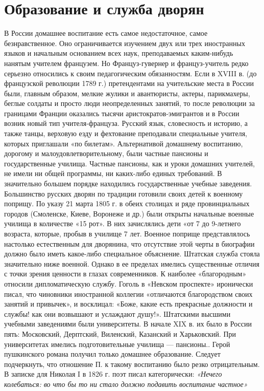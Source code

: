  \section{Образование и служба дворян}
 В России домашнее воспитание есть самое недостаточное, самое безнравственное. Оно ограничивается изучением двух или трех иностранных языков и начальным основанием всех наук, преподаваемых каким-нибудь нанятым учителем французем. Но Француз-гувернер и француз-учитель редко серьезно относились к своим педагогическим обязанностям. Если в XVIII в. (до французской революции 1789 г.) претендентами на учительские места в России были, главным образом, мелкие жулики и авантюристы, актеры, парикмахеры, беглые солдаты и просто люди неопределенных занятий, то после революции за границами Франции оказались тысячи аристократов-эмигрантов и в России возник новый тип учителя-француза. 
 Русский язык, словесность и историю, а также танцы, верховую езду и фехтование преподавали специальные учителя, которых приглашали «по билетам».
Альтернативой домашнему воспитанию, дорогому и малоудовлетворительному, были частные пансионы и государственные училища. Частные пансионы, как и уроки домашних учителей, не имели ни общей программы, ни каких-либо единых требований.%
В значительно большем порядке находились государственные учебные заведения. Большинство русских дворян по традиции готовили своих детей к военному поприщу. По указу 21 марта 1805 г. в обеих столицах и ряде провинциальных городов (Смоленске, Киеве, Воронеже и др.) были открыты начальные военные училища в количестве 
«15 рот». В них зачислялись дети «от 7 до 9-летнего возраста, которые, пробыв в училище 7 лет.  Военное поприще представлялось настолько естественным для дворянина, что отсутствие этой черты в биографии должно было иметь какое-либо специальное объяснение. 
Штатская служба стояла значительно ниже военной. Однако в ее пределах имелись существенные отличия с точки зрения ценности в глазах современников. К наиболее «благородным» относили дипломатическую службу. Гоголь в «Невском проспекте» иронически писал, что чиновники иностранной коллегии «отличаются благородством 
своих занятий и привычек», и восклицал: «Боже, какие есть прекрасные должности и службы! как они возвышают и услаждают душу!».
Штатскими высшими учебными заведениями были университеты. В начале XIX в. их было в России пять: Московский, Дерптский, Виленский, Казанский и Харьковский. При университетах имелись подготовительные училища — пансионы..
Герой пушкинского романа получил только домашнее образование. Следует подчеркнуть, что отношение П. к такому воспитанию было резко отрицательным. В записке для Николая I в 1826 г. поэт писал категорически: \emph{«Нечего колебаться: во что бы то ни стало должно подавить воспитание частное»} 

